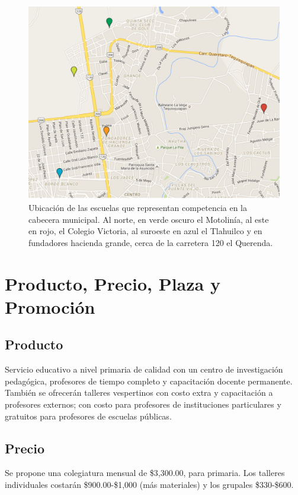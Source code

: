 \documentclass[10pt,letterpaper,oneside]{book}
\begin{document}
\begin{figure}[h]
\centering
\includegraphics[scale=0.6]{mapatequis.pdf}
\caption{Ubicación de las escuelas que representan competencia en la cabecera municipal. Al norte, en verde oscuro el Motolinía, al este en rojo, el Colegio Victoria, al suroeste en azul el Tlahuilco y en fundadores hacienda grande, cerca de la carretera 120 el Querenda.}
\end{figure}

\section{Producto, Precio, Plaza y Promoción}

\subsection{Producto}
Servicio educativo a nivel primaria de calidad con un centro de investigación pedagógica, profesores de tiempo completo y capacitación docente permanente. También se ofrecerán talleres vespertinos con costo extra y capacitación a profesores externos; con costo para profesores de instituciones particulares y gratuitos para profesores de escuelas públicas. 


\subsection{Precio}
Se propone una colegiatura mensual de \$3,300.00, para primaria. Los talleres individuales costarán \$900.00-\$1,000 (más materiales) y los grupales \$330-\$600. 
\end{document}
